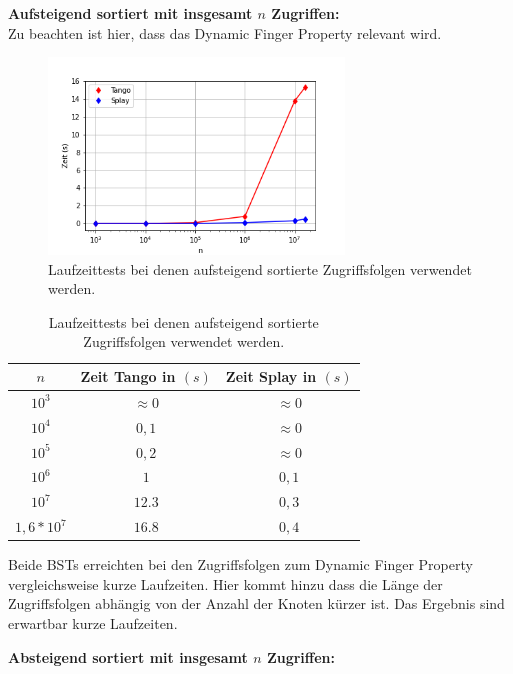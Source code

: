 \documentclass[a4paper,12pt]{article}
\begin{document}
 \bigskip

\noindent \textbf{Aufsteigend sortiert mit insgesamt $n$ Zugriffen:}\\
\bigskip
Zu beachten ist hier, dass das Dynamic Finger Property relevant wird. 

\begin{figure}[H]
	\centering
	\includegraphics[width=0.7\textwidth]{Medien/laufzeittest/diagramm/sorted1}
	\caption{Laufzeittests bei denen aufsteigend sortierte Zugriffsfolgen verwendet werden.}
\end{figure}
\begin{table}[H]
	\begin{center}
		\begin{tabular}[c]{|c|c|c|}
			\hline
			$n$ & Zeit Tango in $\left(s\right)$ &Zeit Splay in $\left(s\right)$ \\
			\hline
			$10^3$ & $\approx 0$ &$\approx 0$ \\
			\hline
			$10^4$  & $0,1$ &$\approx 0$  \\
			\hline
			$10^5$  & $0,2$ &$\approx 0$  \\
			\hline
			$10^6$  & $1$ &$0,1$  \\
			\hline
			$10^7$  & $12.3$ &$0,3$  \\
			\hline
			$1,6 *10^7$  & $16.8$ &$0,4$  \\
			\hline
		\end{tabular}
		\caption{Laufzeittests bei denen aufsteigend sortierte Zugriffsfolgen verwendet werden.} 
	\end{center}
\end{table}
\noindent Beide BSTs erreichten bei den Zugriffsfolgen zum Dynamic Finger Property  vergleichsweise kurze Laufzeiten. Hier kommt hinzu dass die Länge der Zugriffsfolgen abhängig von der Anzahl der Knoten kürzer ist. Das Ergebnis sind erwartbar kurze Laufzeiten.
\newpage

\bigskip
\noindent \textbf{Absteigend sortiert mit insgesamt $n$ Zugriffen:\\}
\end{document}
